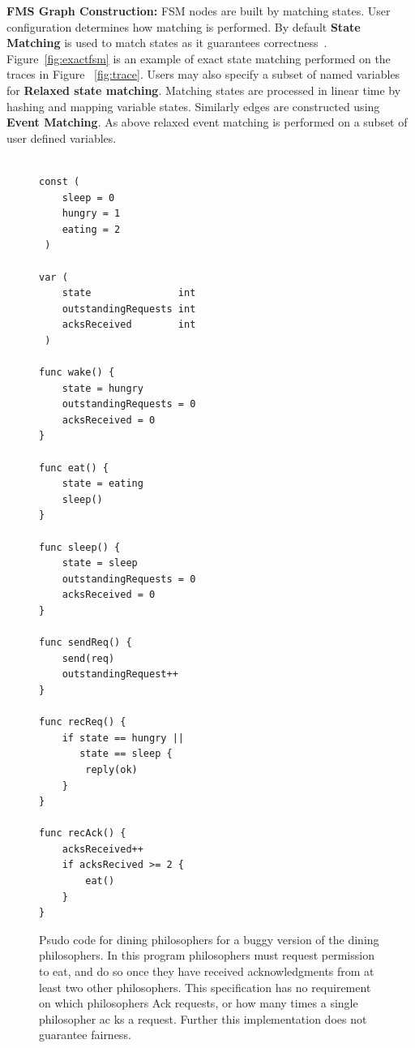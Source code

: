 \noindent\textbf{FMS Graph Construction:} FSM nodes are built by matching
states. User configuration determines how matching is performed. By default
\textbf{State Matching} is used to match states as it guarantees
correctness~\cite{Garg:2014:MAS:2580115.2580404}. Figure~\ref{fig:exactfsm}
is an example of exact state matching performed on the traces in Figure
~\ref{fig:trace}. Users may also specify a subset of named variables for
\textbf{Relaxed state matching}.  Matching states are processed in linear time
by hashing and mapping variable states. Similarly edges are constructed using
\textbf{Event Matching}. As above relaxed event matching is performed on a
subset of user defined variables.

\begin{figure}
\begin{lstlisting}

const (
    sleep = 0
    hungry = 1
    eating = 2
 )

var (
    state               int
    outstandingRequests int
    acksReceived        int
 )

func wake() {
    state = hungry
    outstandingRequests = 0
    acksReceived = 0
}

func eat() {
    state = eating
    sleep()
}

func sleep() {
    state = sleep
    outstandingRequests = 0
    acksReceived = 0
}

func sendReq() {
    send(req)
    outstandingRequest++
}

func recReq() {
    if state == hungry ||
       state == sleep {
        reply(ok)
    }
}

func recAck() {
    acksReceived++ 
    if acksRecived >= 2 {
        eat()
    }
}
\end{lstlisting}

\caption{Psudo code for dining philosophers for a buggy version of the dining
    philosophers. In this program philosophers must request permission to eat,
    and do so once they have received acknowledgments from at least two other
    philosophers. This specification has no requirement on which philosophers Ack
    requests, or how many times a single philosopher ac ks a request. Further this
    implementation does not guarantee fairness.}

\label{fig:spec}
\end{figure}

